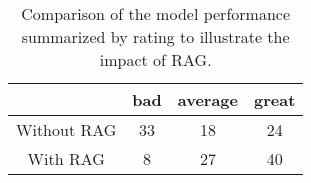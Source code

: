 \begin{table}[H]
\centering
\begin{tabular}[H]{|c|c|c|c|}
\toprule
 & bad & average & great \\
\midrule
Without RAG & 33 & 18 & 24 \\
With RAG & 8 & 27 & 40 \\
\bottomrule
\end{tabular}
\caption{Comparison of the model performance summarized by rating to illustrate the impact of RAG.}
\end{table}
